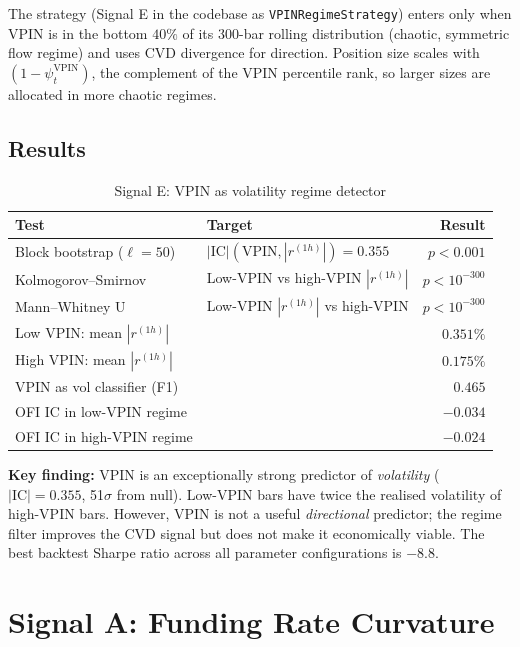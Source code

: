 \documentclass[12pt, a4paper]{article}
\theoremstyle{definition}
\newcommand{\IC}{\mathrm{IC}}
\begin{document}
The strategy (Signal E in the codebase as \texttt{VPINRegimeStrategy}) enters
only when VPIN is in the bottom $40\%$ of its 300-bar rolling distribution
(chaotic, symmetric flow regime) and uses CVD divergence for direction.
Position size scales with $(1 - \psi_t^{\text{VPIN}})$, the complement of
the VPIN percentile rank, so larger sizes are allocated in more chaotic regimes.

\subsection{Results}

\begin{table}[H]
\centering
\caption{Signal E: VPIN as volatility regime detector}
\begin{tabular}{llr}
\toprule
Test & Target & Result \\
\midrule
Block bootstrap ($\ell=50$) & $|\IC|(\text{VPIN}, |r^{(1h)}|) = 0.355$ & $p < 0.001$ \\
Kolmogorov--Smirnov & Low-VPIN vs high-VPIN $|r^{(1h)}|$ & $p < 10^{-300}$ \\
Mann--Whitney U & Low-VPIN $|r^{(1h)}|$ vs high-VPIN & $p < 10^{-300}$ \\
\midrule
Low VPIN: mean $|r^{(1h)}|$ & & $0.351\%$ \\
High VPIN: mean $|r^{(1h)}|$ & & $0.175\%$ \\
VPIN as vol classifier (F1) & & $0.465$ \\
OFI IC in low-VPIN regime & & $-0.034$ \\
OFI IC in high-VPIN regime & & $-0.024$ \\
\bottomrule
\end{tabular}
\end{table}

\textbf{Key finding:} VPIN is an exceptionally strong predictor of
\emph{volatility} ($|\IC| = 0.355$, 51$\sigma$ from null). Low-VPIN bars have
twice the realised volatility of high-VPIN bars. However, VPIN is not a useful
\emph{directional} predictor; the regime filter improves the CVD signal but
does not make it economically viable. The best backtest Sharpe ratio across all
parameter configurations is $-8.8$.


\section{Signal A: Funding Rate Curvature}
\end{document}
